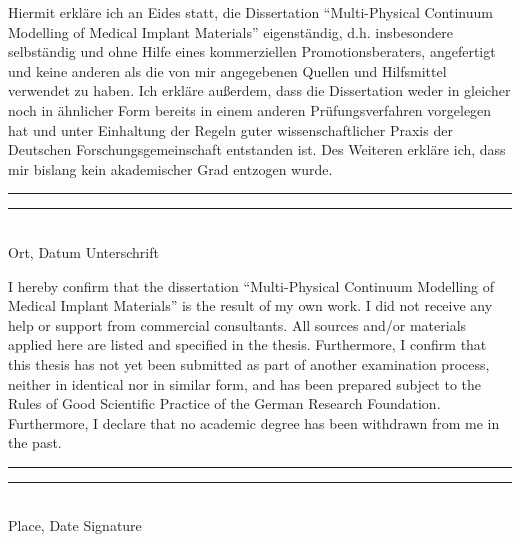 \vspace{1cm}
Hiermit erkläre ich an Eides statt, die Dissertation ``Multi-Physical Continuum Modelling of Medical Implant Materials'' eigenständig, d.h. insbesondere selbständig und ohne Hilfe eines kommerziellen Promotionsberaters, angefertigt und keine anderen als die von mir angegebenen Quellen und Hilfsmittel verwendet zu haben. Ich erkläre außerdem, dass die Dissertation weder in gleicher noch in ähnlicher Form bereits in einem anderen Prüfungsverfahren vorgelegen hat und unter Einhaltung der Regeln guter wissenschaftlicher Praxis der Deutschen Forschungsgemeinschaft entstanden ist. Des Weiteren erkläre ich, dass mir bislang kein akademischer Grad entzogen wurde.

\vspace{2cm}
\rule{5cm}{0.2pt} \hspace{4cm} \rule{5cm}{0.2pt}\\ 
\hspace*{1.5cm} Ort, Datum \hspace{7cm} Unterschrift
\vspace{2cm}

I hereby confirm that the dissertation ``Multi-Physical Continuum Modelling of Medical Implant Materials'' is the result of my own work. I did not receive any help or support from commercial consultants. All sources and/or materials applied here are listed and specified in the thesis. Furthermore, I confirm that this thesis has not yet been submitted as part of another examination process, neither in identical nor in similar form, and has been prepared subject to the Rules of Good Scientific Practice of the German Research Foundation. Furthermore, I declare that no academic degree has been withdrawn from me in the past.

\vspace{2cm}
\rule{5cm}{0.2pt} \hspace{4cm} \rule{5cm}{0.2pt}\\ 
\hspace*{1.5cm} Place, Date \hspace{7.2cm} Signature
